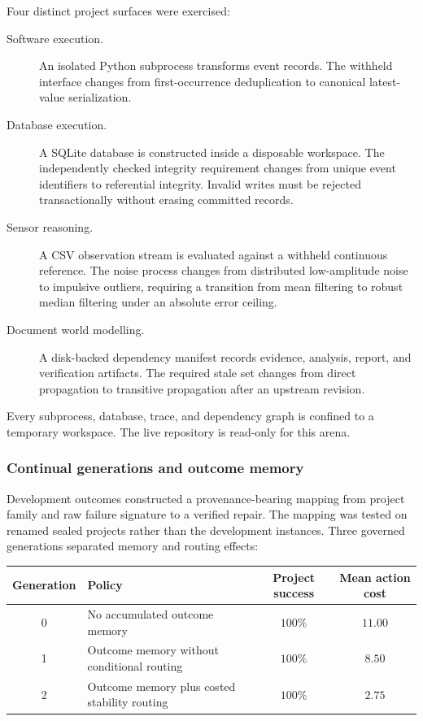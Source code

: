 Four distinct project surfaces were exercised:
\begin{description}
  \item[Software execution.] An isolated Python subprocess transforms event
  records.  The withheld interface changes from first-occurrence
  deduplication to canonical latest-value serialization.

  \item[Database execution.] A SQLite database is constructed inside a
  disposable workspace.  The independently checked integrity requirement
  changes from unique event identifiers to referential integrity.  Invalid
  writes must be rejected transactionally without erasing committed records.

  \item[Sensor reasoning.] A CSV observation stream is evaluated against a
  withheld continuous reference.  The noise process changes from distributed
  low-amplitude noise to impulsive outliers, requiring a transition from mean
  filtering to robust median filtering under an absolute error ceiling.

  \item[Document world modelling.] A disk-backed dependency manifest records
  evidence, analysis, report, and verification artifacts.  The required stale
  set changes from direct propagation to transitive propagation after an
  upstream revision.
\end{description}

Every subprocess, database, trace, and dependency graph is confined to a
temporary workspace.  The live repository is read-only for this arena.


\subsubsection{Continual generations and outcome memory}

Development outcomes constructed a provenance-bearing mapping from project
family and raw failure signature to a verified repair.  The mapping was tested
on renamed sealed projects rather than the development instances.  Three
governed generations separated memory and routing effects:

\begin{center}
\small
\begin{tabular}{|c|>{\raggedright\arraybackslash}p{5.6cm}|c|c|}
\hline
\textbf{Generation} & \textbf{Policy} & \textbf{Project success} & \textbf{Mean action cost} \\
\hline
0 & No accumulated outcome memory & $100\%$ & $11.00$ \\
\hline
1 & Outcome memory without conditional routing & $100\%$ & $8.50$ \\
\hline
2 & Outcome memory plus costed stability routing & $100\%$ & $2.75$ \\
\hline
\end{tabular}
\end{center}

